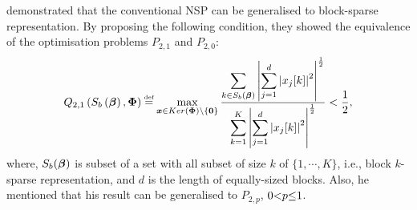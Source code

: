 \cite{Stojnic2009a} demonstrated that the conventional NSP can be generalised to block-sparse representation. 
By proposing the following condition, they showed the equivalence of the optimisation problems $P_{2,1}$ and $P_{2,0}$:
\begin{gather*}
Q_{2,1}\myparanthese{S_b\myparanthese{\mybeta},\myPhi} \myeq \max_{\boldsymbol{x} \in \myKerMath \backslash\left\{\boldsymbol{0}\right\}} \frac{\displaystyle\sum_{k \in S_b\myparanthese{\mybeta}} \myabs{\displaystyle\sum_{j=1}^{d} \myabs{x_{j}[k]} ^{2}} ^{\frac{1}{2}}}{\displaystyle\sum_{k=1}^{K} \myabs{\displaystyle\sum_{j=1}^{d} \myabs{x_{j}[k]} ^{2}} ^{\frac{1}{2}}} < \frac12,
\end{gather*}
where, $S_b(\boldsymbol{\beta})$ is subset of a set with all subset of size $k$ of $\{1, \cdots , K\}$, i.e., block $k$-sparse representation, and $d$ is the length of equally-sized blocks.
Also, he mentioned that his result can be generalised to $P_{2,p}$, $0 {<} p {\leq} 1$.